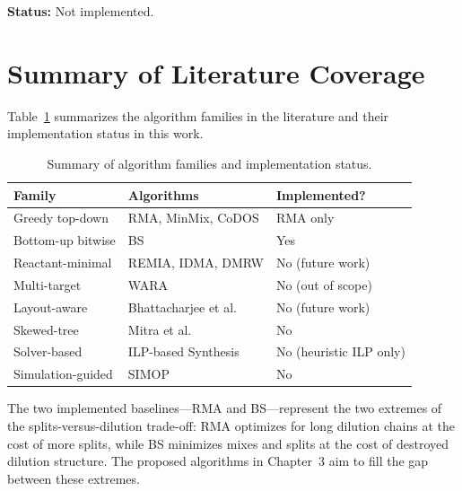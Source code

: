 \textbf{Status:} Not implemented.

\section{Summary of Literature Coverage}

Table~\ref{tab:lit_coverage} summarizes the algorithm families in the literature and their implementation status in this work.

\begin{table}[H]
\centering
\caption{Summary of algorithm families and implementation status.}
\label{tab:lit_coverage}
\begin{tabular}{|l|l|l|}
\hline
\textbf{Family} & \textbf{Algorithms} & \textbf{Implemented?} \\
\hline
Greedy top-down & RMA, MinMix, CoDOS & RMA only \\
\hline
Bottom-up bitwise & BS & Yes \\
\hline
Reactant-minimal & REMIA, IDMA, DMRW & No (future work) \\
\hline
Multi-target & WARA & No (out of scope) \\
\hline
Layout-aware & Bhattacharjee et al. & No (future work) \\
\hline
Skewed-tree & Mitra et al. & No \\
\hline
Solver-based & ILP-based Synthesis & No (heuristic ILP only) \\
\hline
Simulation-guided & SIMOP & No \\
\hline
\end{tabular}
\end{table}

The two implemented baselines---RMA and BS---represent the two extremes of the splits-versus-dilution trade-off: RMA optimizes for long dilution chains at the cost of more splits, while BS minimizes mixes and splits at the cost of destroyed dilution structure. The proposed algorithms in Chapter~3 aim to fill the gap between these extremes.
